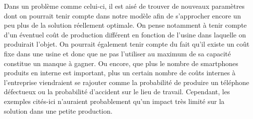 Dans un problème comme celui-ci, il est aisé de trouver de nouveaux paramètres dont on pourrait tenir compte dans notre modèle afin de s'approcher encore un peu plus de la solution réellement optimale. On pense notamment à tenir compte d'un éventuel coût de production différent en fonction de l'usine dans laquelle on produirait l'objet. On pourrait également tenir compte du fait qu'il existe un coût fixe dans une usine et donc que ne pas l'utiliser au maximum de sa capacité constitue un manque à gagner. Ou encore, que plus le nombre de smartphones produits en interne est important, plus un certain nombre de coûts internes à l'entreprise viendraient se rajouter comme la probabilité de produire un téléphone défectueux ou la probabilité d'accident sur le lieu de travail. Cependant, les exemples cités-ici n'auraient probablement qu'un impact très limité sur la solution dans une petite production.